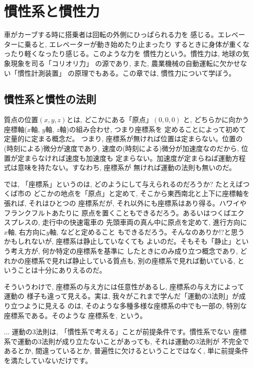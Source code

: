 \chapter{慣性系と慣性力}

車がカーブする時に搭乗者は回転の外側にひっぱられる力を
感じる。エレベーターに乗ると, エレベーターが動き始めたり止まったり
するときに身体が重くなったり軽くなったり感じる。このような力を
慣性力という。慣性力は, 地球の気象現象を司る「コリオリ力」
の源であり, また, 農業機械の自動運転に欠かせない「慣性計測装置」
の原理でもある。この章では, 慣性力について学ぼう。


\section{慣性系と慣性の法則}
質点の位置$(x, y, z)$とは, どこかにある「原点」$(0, 0, 0)$
と, どちらかに向かう座標軸($x$軸, $y$軸, $z$軸)の組み合わせ, つまり座標系を
定めることによって初めて定量的に定まる概念だ。
つまり, 座標系が無ければ位置は定まらない。位置の(時刻による)微分が速度であり, 
速度の(時刻による)微分が加速度なのだから, 位置が定まらなければ速度も加速度も
定まらない。加速度が定まらねば運動方程式は意味を持たない。すなわち, 座標系が
無ければ運動の法則も無いのだ。

では, 「座標系」というのは, どのようにして与えられるのだろうか? たとえばつくば市の
どこかの地点を「原点」と定めて, そこから東西南北と上下に座標軸を張れば, それはひとつの
座標系だが, それ以外にも座標系はあり得る。ハワイやフランクフルトあたりに
原点を置くこともできるだろう。あるいはつくばエクスプレスの, 走行中の快速電車の
先頭車両の真ん中に原点を定めて, 進行方向に$x$軸, 右方向に$y$軸, などと定めること
もできるだろう。そんなのありか!?と思うかもしれないが, 座標系は静止していなくても
よいのだ。そもそも「静止」という考え方が, 何か特定の座標系を基準に
したときにのみ成り立つ概念であり, どれかの座標系で見れば静止している質点も, 
別の座標系で見れば動いている, ということは十分にありえるのだ。

そういうわけで, 座標系の与え方には任意性があるし, 座標系の与え方によって運動の
様子も違って見える。実は, 我々がこれまで学んだ「運動の3法則」が成り立つように見える
のは, そのような多種多様な座標系の中でも一部の, 特別な座標系である。そのような
座標系を, という。

\begin{faq}{\small{}
... 運動の3法則は, 「慣性系で考える」ことが前提条件です。慣性系でない
座標系で運動の3法則が成り立たないことがあっても, それは運動の3法則が
不完全であるとか, 間違っているとか, 普遍性に欠けるということではなく, 
単に前提条件を満たしていないだけです。}\end{faq}

